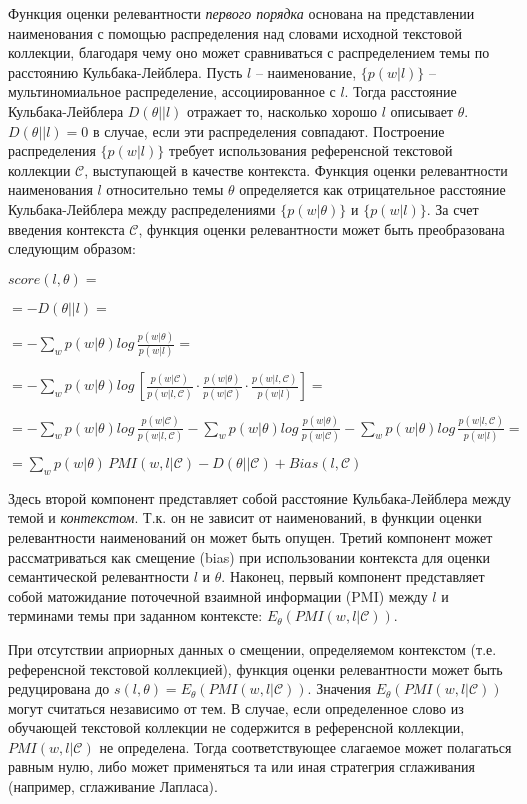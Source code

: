 Функция оценки релевантности \textit{первого порядка} основана на представлении наименования с помощью распределения над словами исходной текстовой коллекции, благодаря чему оно может сравниваться с распределением темы по расстоянию Кульбака-Лейблера. Пусть $l$ -- наименование, $\{p(w|l)\}$ -- мультиномиальное распределение, ассоциированное с $l$. Тогда расстояние Кульбака-Лейблера $D(\theta||l)$ отражает то, насколько хорошо $l$ описывает $\theta$.  $D(\theta||l) = 0$ в случае, если эти распределения совпадают. Построение распределения $\{p(w|l)\}$ требует использования референсной текстовой коллекции $\mathcal{C}$, выступающей в качестве контекста. Функция оценки релевантности наименования $l$ относительно темы $\theta$ определяется как отрицательное расстояние Кульбака-Лейблера между распределениями $\{p(w|\theta)\}$ и $\{p(w|l)\}$. За счет введения контекста $\mathcal{C}$, функция оценки релевантности может быть преобразована следующим образом:

$score(l, \theta) =$

$= -D(\theta||l) =$

$= -\sum_{w}p(w|\theta)log\,\frac{p(w|\theta)}{p(w|l)} =$

$= -\sum_{w}p(w|\theta)log\,[\frac{p(w|\mathcal{C})}{p(w|l,\mathcal{C})}\cdot  \frac{p(w|\theta)}{p(w|\mathcal{C})}\cdot\frac{p(w|l,\mathcal{C})}{p(w|l)}] =$

$= -\sum_{w}p(w|\theta)log\,\frac{p(w|\mathcal{C})}{p(w|l,\mathcal{C})} -\sum_{w}p(w|\theta)log\,\frac{p(w|\theta)}{p(w|\mathcal{C})} -\sum_{w}p(w|\theta)log\,\frac{p(w|l,\mathcal{C})}{p(w|l)} =$

$= \sum_{w}p(w|\theta)\,PMI(w,l|\mathcal{C}) - D(\theta||\mathcal{C}) + Bias(l, \mathcal{C})$

\noindent Здесь второй компонент представляет собой расстояние Кульбака-Лейблера между темой и \textit{контекстом}. Т.к. он не зависит от наименований, в функции оценки релевантности наименований он может быть опущен. Третий компонент может рассматриваться как смещение (bias) при использовании контекста для оценки семантической релевантности $l$ и $\theta$. Наконец, первый компонент представляет собой матожидание поточечной взаимной информации (PMI) между $l$ и терминами темы при заданном контексте: $E_\theta(PMI(w,l|\mathcal{C}))$.

При отсутствии априорных данных о смещении, определяемом контекстом (т.е. референсной текстовой коллекцией), функция оценки релевантности может быть редуцирована до $s(l,\theta) = E_\theta(PMI(w,l|\mathcal{C}))$. Значения $E_\theta(PMI(w,l|\mathcal{C}))$ могут считаться независимо от тем. В случае, если определенное слово из обучающей текстовой коллекции не содержится в референсной коллекции, $PMI(w,l|\mathcal{C})$ не определена. Тогда соответствующее слагаемое может полагаться равным нулю, либо может применяться та или иная стратегрия сглаживания (например, сглаживание Лапласа). 

